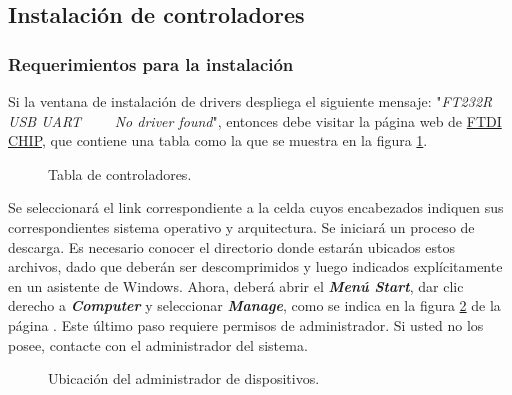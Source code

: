 \subsection{Instalación de controladores}\label{subsec:Error} %
\subsubsection{Requerimientos para la instalación}
Si la ventana de instalación de drivers despliega el siguiente mensaje: "\textit{FT232R USB UART \ \ \ \ No driver found}", entonces debe visitar la página web de \href{http://www.ftdichip.com/Drivers/VCP.htm}{FTDI CHIP}\footnotemark, que contiene una tabla como la que se muestra en la figura \ref{fig:TablaCont}.


\begin{figure}[H] %
\caption{Tabla de controladores.}
\label{fig:TablaCont}
\end{figure}

Se seleccionará el link correspondiente a la celda cuyos encabezados indiquen sus correspondientes sistema operativo y arquitectura. Se iniciará un proceso de descarga. Es necesario conocer el directorio donde estarán ubicados estos archivos, dado que deberán ser descomprimidos y luego indicados explícitamente en un asistente de Windows. Ahora, deberá abrir el \textbf{\textit{Menú Start}}, dar clic derecho a \textbf{\textit{Computer}} y seleccionar \textbf{\textit{Manage}}, como se indica en la figura \ref{fig:Man1} de la página \pageref{fig:Man1}. Este último paso requiere permisos de administrador. Si usted no los posee, contacte con el administrador del sistema.

\begin{figure}[H] %
\caption{Ubicación del administrador de dispositivos.}
\label{fig:Man1}
\end{figure}

